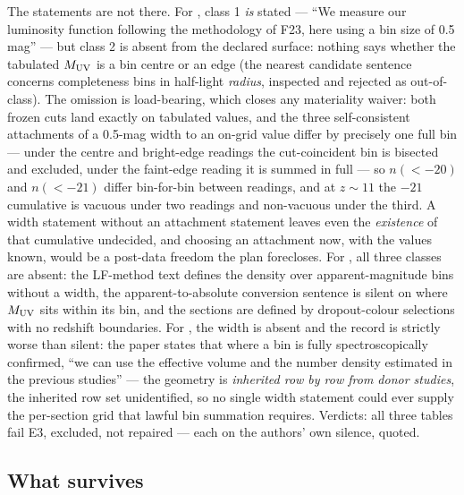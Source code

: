 \documentclass[twocolumn]{aastex702}
\begin{document}
The statements are not there. For \citet{finkelstein24}, class 1 \emph{is} stated ---
``We measure our luminosity function following the methodology of F23, here using a bin
size of 0.5 mag'' --- but class 2 is absent from the declared surface: nothing says
whether the tabulated $M_{\rm UV}$ is a bin centre or an edge (the nearest candidate
sentence concerns completeness bins in half-light \emph{radius}, inspected and rejected
as out-of-class). The omission is load-bearing, which closes any materiality waiver:
both frozen cuts land exactly on tabulated values, and the three self-consistent
attachments of a 0.5-mag width to an on-grid value differ by precisely one full bin ---
under the centre and bright-edge readings the cut-coincident bin is bisected and
excluded, under the faint-edge reading it is summed in full --- so $n(<-20)$ and
$n(<-21)$ differ bin-for-bin between readings, and at $z\sim11$ the $-21$ cumulative is
vacuous under two readings and non-vacuous under the third. A width statement without an
attachment statement leaves even the \emph{existence} of that cumulative undecided, and
choosing an attachment now, with the values known, would be a post-data freedom the plan
forecloses. For \citet{harikane23}, all three classes are absent: the LF-method text
defines the density over apparent-magnitude bins without a width, the
apparent-to-absolute conversion sentence is silent on where $M_{\rm UV}$ sits within its
bin, and the sections are defined by dropout-colour selections with no redshift
boundaries. For \citet{harikane24}, the width is absent and the record is strictly worse
than silent: the paper states that where a bin is fully spectroscopically confirmed,
``we can use the effective volume and the number density estimated in the previous
studies'' \citep[naming][bins as the example]{oesch18} --- the geometry is
\emph{inherited row by row from donor studies}, the inherited row set unidentified, so
no single width statement could ever supply the per-section grid that lawful bin
summation requires. Verdicts: all three tables fail E3, excluded, not repaired ---
each on the authors' own silence, quoted.

\subsection{What survives} \label{sec:metasurvives}
\end{document}
